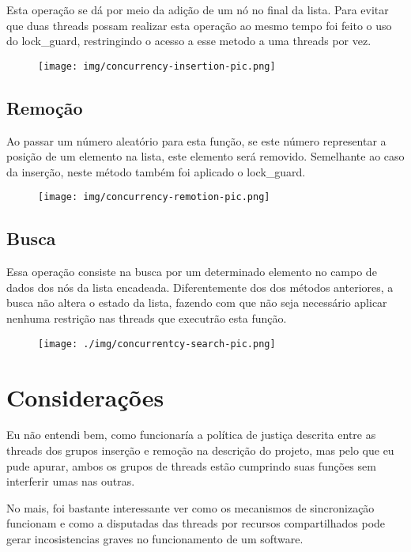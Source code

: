 \documentclass[
	article,			%
	11pt,				%
	oneside,			%
	a4paper,			%
	english,			%
	brazil,				%
	sumario=tradicional
	]{abntex2}
\begin{document}
Esta operação se dá por meio da adição de um nó no final da lista.
Para evitar que duas threads possam realizar esta operação ao mesmo tempo
foi feito o uso do lock\_guard, restringindo o acesso a esse metodo a
uma threads por vez.

\begin{figure}[!h]
\texttt{[image: img/concurrency-insertion-pic.png]}
\centering
\end{figure}

\subsection{Remoção}

Ao passar um número aleatório para esta função, se este número
representar a posição de um elemento na lista, este elemento será
removido. Semelhante ao caso da inserção, neste método também foi
aplicado o lock\_guard.

\begin{figure}[!h]
\texttt{[image: img/concurrency-remotion-pic.png]}
\centering
\end{figure}

\subsection{Busca}
Essa operação consiste na busca por um determinado elemento no campo
de dados dos nós da lista encadeada. Diferentemente dos dos métodos
anteriores, a busca não altera o estado da lista, fazendo com que não
seja necessário aplicar nenhuma restrição nas threads que executrão
esta função.

\begin{figure}[!h]
\texttt{[image: ./img/concurrentcy-search-pic.png]}
\centering
\end{figure}


\section{Considerações}
Eu não entendi bem, como funcionaría a política de justiça descrita
entre as threads dos grupos inserção e remoção na descrição do projeto,
mas pelo que eu pude apurar, ambos os grupos de threads estão cumprindo
suas funções sem interferir umas nas outras.

No mais, foi bastante interessante ver como os mecanismos de
sincronização funcionam e como a disputadas das threads por recursos
compartilhados pode gerar incosistencias graves no funcionamento de um
software.
\end{document}
